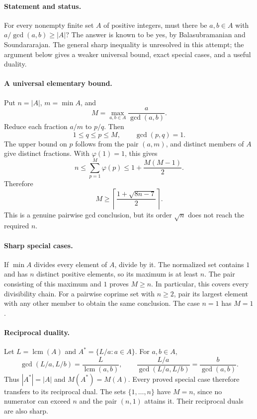 \paragraph{Statement and status.}
For every nonempty finite set \(A\) of positive integers, must there be
\(a,b\in A\) with \(a/\gcd(a,b)\geq |A|\)?
The answer is known to be yes, by Balasubramanian and Soundararajan.
The general sharp inequality is unresolved in this attempt; the argument
below gives a weaker universal bound, exact special cases, and a useful
duality.

\paragraph{A universal elementary bound.}
Put \(n=|A|\), \(m=\min A\), and
\[
 M=\max_{a,b\in A}\frac{a}{\gcd(a,b)}.
\]
Reduce each fraction \(a/m\) to \(p/q\). Then
\[
 1\leq q\leq p\leq M,\qquad \gcd(p,q)=1.
\]
The upper bound on \(p\) follows from the pair \((a,m)\), and distinct
members of \(A\) give distinct fractions. With \(\varphi(1)=1\), this gives
\[
 n\leq\sum_{p=1}^{M}\varphi(p)
 \leq1+\frac{M(M-1)}2.
\]
Therefore
\[
 M\geq
 \left\lceil\frac{1+\sqrt{8n-7}}2\right\rceil .
 \tag{1}
\]
This is a genuine pairwise gcd conclusion, but its order \(\sqrt n\)
does not reach the required \(n\).

\paragraph{Sharp special cases.}
If \(\min A\) divides every element of \(A\), divide by it. The normalized
set contains \(1\) and has \(n\) distinct positive elements, so its maximum
is at least \(n\). The pair consisting of this maximum and \(1\) proves
\(M\geq n\). In particular, this covers every divisibility chain.
For a pairwise coprime set with \(n\geq2\), pair its largest element
with any other member to obtain the same conclusion. The case \(n=1\)
has \(M=1\).

\paragraph{Reciprocal duality.}
Let \(L=\operatorname{lcm}(A)\) and \(A^*=\{L/a:a\in A\}\).
For \(a,b\in A\),
\[
 \gcd(L/a,L/b)=\frac{L}{\operatorname{lcm}(a,b)},\qquad
 \frac{L/a}{\gcd(L/a,L/b)}=\frac{b}{\gcd(a,b)}.
\]
Thus \(|A^*|=|A|\) and \(M(A^*)=M(A)\). Every proved special case
therefore transfers to its reciprocal dual. The sets
\(\{1,\ldots,n\}\) have \(M=n\), since no numerator can exceed \(n\)
and the pair \((n,1)\) attains it. Their reciprocal duals are also sharp.


